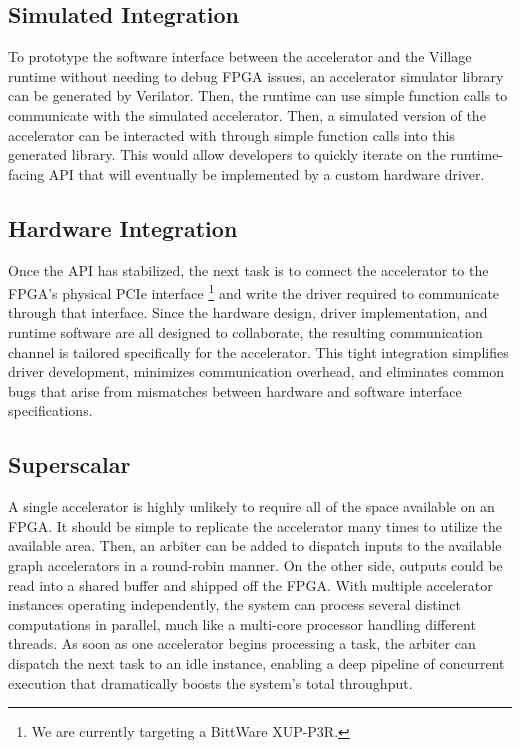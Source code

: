 \documentclass[sigconf, nonacm]{acmart}
\begin{document}
\subsection{Simulated Integration}

To prototype the software interface between the accelerator and the Village runtime without needing to debug FPGA issues, an accelerator simulator library can be generated by Verilator.
Then, the runtime can use simple function calls to communicate with the simulated accelerator.
Then, a simulated version of the accelerator can be interacted with through simple function calls into this generated library.
This would allow developers to quickly iterate on the runtime-facing API that will eventually be implemented by a custom hardware driver.

\subsection{Hardware Integration}

Once the API has stabilized, the next task is to connect the accelerator to the FPGA's physical PCIe interface \footnote{We are currently targeting a BittWare XUP-P3R.} and write the driver required to communicate through that interface.
Since the hardware design, driver implementation, and runtime software are all designed to collaborate, the resulting communication channel is tailored specifically for the accelerator.
This tight integration simplifies driver development, minimizes communication overhead, and eliminates common bugs that arise from mismatches between hardware and software interface specifications.

\subsection{Superscalar}

A single accelerator is highly unlikely to require all of the space available on an FPGA.
It should be simple to replicate the accelerator many times to utilize the available area.
Then, an arbiter can be added to dispatch inputs to the available graph accelerators in a round-robin manner.
On the other side, outputs could be read into a shared buffer and shipped off the FPGA.
With multiple accelerator instances operating independently, the system can process several distinct computations in parallel, much like a multi-core processor handling different threads.
As soon as one accelerator begins processing a task, the arbiter can dispatch the next task to an idle instance, enabling a deep pipeline of concurrent execution that dramatically boosts the system's total throughput.
\end{document}
